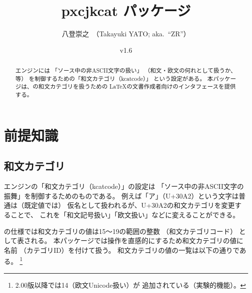 \documentclass[uplatex,dvipdfmx,a4paper]{jsarticle}
\newcommand{\PkgVersion}{1.6}
\newcommand{\PkgDate}{2025/02/20}
\newcommand{\Pkg}[1]{\textsf{#1}}
\newcommand{\strong}{\textsf}
\begin{document}
\title{\Pkg{pxcjkcat} パッケージ}
\author{八登崇之\ （Takayuki YATO; aka.~``ZR''）}
\date{v\PkgVersion\quad[\PkgDate]}
\maketitle

\begin{abstract}
{\upTeX}エンジンには
「ソース中の非ASCII文字の扱い」
（和文・欧文の何れとして扱うか、等）
を制御するための「和文カテゴリ（kcatcode）」
という設定がある。
本パッケージは、{\upTeX}の和文カテゴリを扱うための
{\LaTeX}の文書作成者向けのインタフェースを提供する。
\end{abstract}

\tableofcontents

\section{前提知識}
\label{sec:Introduction}

\subsection{和文カテゴリ}
\label{ssec:cjkcategory}

{\upTeX}エンジンの「\strong{和文カテゴリ}（kcatcode）」の設定は
「ソース中の非ASCII文字の振舞」を制御するためのものである。
例えば「ア」（U+30A2）という文字は普通は（既定値では）
仮名として扱われるが、U+30A2の和文カテゴリを変更することで、
これを「和文記号扱い」「欧文扱い」などに変えることができる。

{\upTeX}の仕様では和文カテゴリの値は15～19の範囲の整数
（\strong{和文カテゴリコード}）
として表される。
本パッケージでは操作を直感的にするため和文カテゴリの値に名前
（\strong{カテゴリID}）を付けて扱う。
和文カテゴリの値の一覧は以下の通りである。
\footnote{2.00版以降では14（欧文Unicode扱い）が
追加されている（実験的機能）。}
\end{document}
